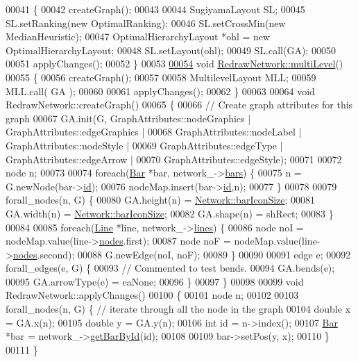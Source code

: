 \begin{DoxyCode}
00041 \{
00042   createGraph();
00043 
00044   SugiyamaLayout SL;
00045   SL.setRanking(\textcolor{keyword}{new} OptimalRanking);
00046   SL.setCrossMin(\textcolor{keyword}{new} MedianHeuristic);
00047   OptimalHierarchyLayout *ohl = \textcolor{keyword}{new} OptimalHierarchyLayout;
00048   SL.setLayout(ohl);
00049   SL.call(GA);
00050 
00051   applyChanges();
00052 \}
00053 
\hypertarget{redrawnetwork_8cpp_source_l00054}{}\hyperlink{class_redraw_network_a56a92ad06ae0198ee60160aa66aa0ce1}{00054} \textcolor{keywordtype}{void} \hyperlink{class_redraw_network_a56a92ad06ae0198ee60160aa66aa0ce1}{RedrawNetwork::multiLevel}()
00055 \{
00056   createGraph();
00057 
00058   MultilevelLayout MLL;
00059   MLL.call( GA );
00060 
00061   applyChanges();
00062 \}
00063 
00064 \textcolor{keywordtype}{void} RedrawNetwork::createGraph()
00065 \{
00066 \textcolor{comment}{// Create graph attributes for this graph}
00067   GA.init(G, GraphAttributes::nodeGraphics | GraphAttributes::edgeGraphics |
00068           GraphAttributes::nodeLabel | GraphAttributes::nodeStyle |
00069           GraphAttributes::edgeType | GraphAttributes::edgeArrow |
00070           GraphAttributes::edgeStyle);
00071 
00072   node n;
00073 
00074   \textcolor{keywordflow}{foreach}(\hyperlink{class_bar}{Bar} *bar, network\_->\hyperlink{class_network_a7fe628f7de34a96235cbd3f2cee4aff2}{bars}) \{
00075     n = G.newNode(bar->\hyperlink{class_bar_a9dc5c6a6d44fe412ae34ef8a881b8dce}{id});
00076     nodeMap.insert(bar->\hyperlink{class_bar_a9dc5c6a6d44fe412ae34ef8a881b8dce}{id},n);
00077   \}
00078 
00079   forall\_nodes(n, G) \{
00080     GA.height(n) = \hyperlink{group___graphics_gaa334bbc93b3fde219840e95e23198b53}{Network::barIconSize};
00081     GA.width(n) = \hyperlink{group___graphics_gaa334bbc93b3fde219840e95e23198b53}{Network::barIconSize};
00082     GA.shape(n) = shRect;
00083   \}
00084 
00085   \textcolor{keywordflow}{foreach}(\hyperlink{class_line}{Line} *line, network\_->\hyperlink{class_network_acda0fd42e712e460a08a0e96511ee7eb}{lines}) \{
00086     node noI = nodeMap.value(line->\hyperlink{class_line_afd17c40d656e6a8d677cb22df5f0c70b}{nodes}.first);
00087     node noF = nodeMap.value(line->\hyperlink{class_line_afd17c40d656e6a8d677cb22df5f0c70b}{nodes}.second);
00088     G.newEdge(noI, noF);
00089   \}
00090 
00091   edge e;
00092   forall\_edges(e, G) \{
00093     \textcolor{comment}{// Commented to test bends.}
00094    GA.bends(e);
00095     GA.arrowType(e) = eaNone;
00096   \}
00097 \}
00098 
00099 \textcolor{keywordtype}{void} RedrawNetwork::applyChanges()
00100 \{
00101   node n;
00102 
00103   forall\_nodes(n, G) \{  \textcolor{comment}{// iterate through all the node in the graph}
00104     \textcolor{keywordtype}{double} x = GA.x(n);
00105     \textcolor{keywordtype}{double} y = GA.y(n);
00106     \textcolor{keywordtype}{int} \textcolor{keywordtype}{id} = n->index();
00107     \hyperlink{class_bar}{Bar} *bar = network\_->\hyperlink{group___graphics_ga04d524ce0fa0dd0d06deda92b1597af0}{getBarById}(\textcolor{keywordtype}{id});
00108 
00109     bar->setPos(y, x);
00110   \}
00111 \}
\end{DoxyCode}
